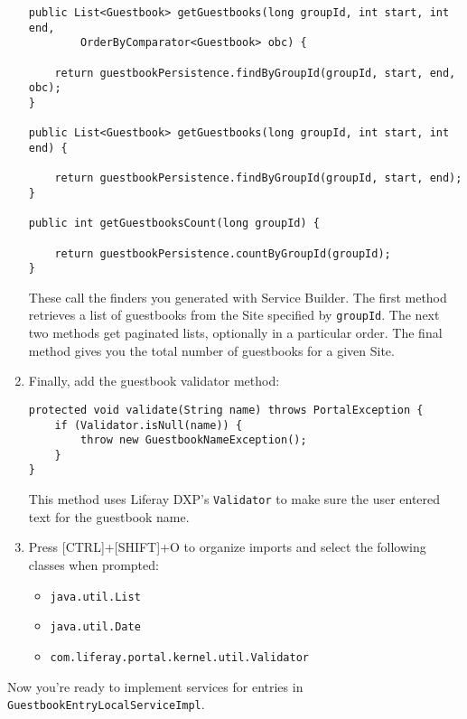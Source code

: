 \begin{enumerate}
\begin{verbatim}
public List<Guestbook> getGuestbooks(long groupId, int start, int end,
        OrderByComparator<Guestbook> obc) {

    return guestbookPersistence.findByGroupId(groupId, start, end, obc);
}

public List<Guestbook> getGuestbooks(long groupId, int start, int end) {

    return guestbookPersistence.findByGroupId(groupId, start, end);
}

public int getGuestbooksCount(long groupId) {

    return guestbookPersistence.countByGroupId(groupId);
}
\end{verbatim}

  These call the finders you generated with Service Builder. The first
  method retrieves a list of guestbooks from the Site specified by
  \texttt{groupId}. The next two methods get paginated lists, optionally
  in a particular order. The final method gives you the total number of
  guestbooks for a given Site.
\item
  Finally, add the guestbook validator method:

\begin{verbatim}
protected void validate(String name) throws PortalException {
    if (Validator.isNull(name)) {
        throw new GuestbookNameException();
    }
}
\end{verbatim}

  This method uses Liferay DXP's \texttt{Validator} to make sure the
  user entered text for the guestbook name.
\item
  Press {[}CTRL{]}+{[}SHIFT{]}+O to organize imports and select the
  following classes when prompted:

  \begin{itemize}
  \tightlist
  \item
    \texttt{java.util.List}
  \item
    \texttt{java.util.Date}
  \item
    \texttt{com.liferay.portal.kernel.util.Validator}
  \end{itemize}
\end{enumerate}

Now you're ready to implement services for entries in
\texttt{GuestbookEntryLocalServiceImpl}.

